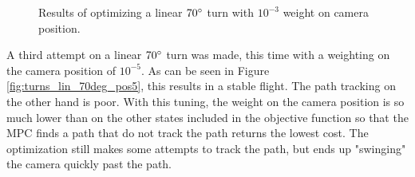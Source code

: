 \begin{figure}
	\caption{Results of optimizing a linear $70\degree$ turn with $10^{-3}$ weight on camera position.}
	\label{fig:turns_lin_70deg_pos3}
\end{figure}

A third attempt on a linear $70\degree$ turn was made, this time with a weighting on the camera position of $10^{-5}$. As can be seen in Figure \ref{fig:turns_lin_70deg_pos5}, this results in a stable flight. The path tracking on the other hand is poor. With this tuning, the weight on the camera position is so much lower than on the other states included in the objective function so that the MPC finds a path that do not track the path returns the lowest cost. The optimization still makes some attempts to track the path, but ends up "swinging" the camera quickly past the path.

